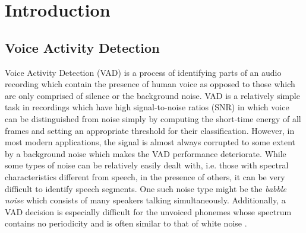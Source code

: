 
\chapter{Introduction} %

\label{Chapter1} %



\section{Voice Activity Detection}

Voice Activity Detection (VAD) is a process of identifying parts of an audio recording which contain the presence of human voice as opposed to those which are only comprised of silence or the background noise. VAD is a relatively simple task in recordings which have high signal-to-noise ratios (SNR) in which voice can be distinguished from noise simply by computing the short-time energy of all frames and setting an appropriate threshold for their classification. However, in most modern applications, the signal is almost always corrupted to some extent by a background noise which makes the VAD performance deteriorate. While some types of noise can be relatively easily dealt with, i.e. those with spectral characteristics different from speech, in the presence of others, it can be very difficult to identify speech segments. One such noise type might be the \emph{babble noise} which consists of many speakers talking simultaneously. Additionally, a VAD decision is especially difficult for the unvoiced phonemes whose spectrum contains no periodicity and is often similar to that of white noise \cite{Kondoz, Michaelis}.

